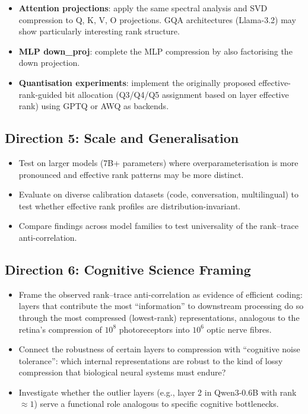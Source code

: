 \documentclass[11pt]{article}
\begin{document}
\begin{itemize}
    \item \textbf{Attention projections}: apply the same spectral analysis and SVD compression to Q, K, V, O projections.  GQA architectures (Llama-3.2) may show particularly interesting rank structure.
    \item \textbf{MLP down\_proj}: complete the MLP compression by also factorising the down projection.
    \item \textbf{Quantisation experiments}: implement the originally proposed effective-rank-guided bit allocation (Q3/Q4/Q5 assignment based on layer effective rank) using GPTQ or AWQ as backends.
\end{itemize}

\subsection{Direction 5: Scale and Generalisation}

\begin{itemize}
    \item Test on larger models (7B+ parameters) where overparameterisation is more pronounced and effective rank patterns may be more distinct.
    \item Evaluate on diverse calibration datasets (code, conversation, multilingual) to test whether effective rank profiles are distribution-invariant.
    \item Compare findings across model families to test universality of the rank--trace anti-correlation.
\end{itemize}

\subsection{Direction 6: Cognitive Science Framing}

\begin{itemize}
    \item Frame the observed rank--trace anti-correlation as evidence of efficient coding: layers that contribute the most ``information'' to downstream processing do so through the most compressed (lowest-rank) representations, analogous to the retina's compression of $10^8$ photoreceptors into $10^6$ optic nerve fibres.
    \item Connect the robustness of certain layers to compression with ``cognitive noise tolerance'': which internal representations are robust to the kind of lossy compression that biological neural systems must endure?
    \item Investigate whether the outlier layers (e.g., layer 2 in Qwen3-0.6B with rank $\approx 1$) serve a functional role analogous to specific cognitive bottlenecks.
\end{itemize}
\end{document}
